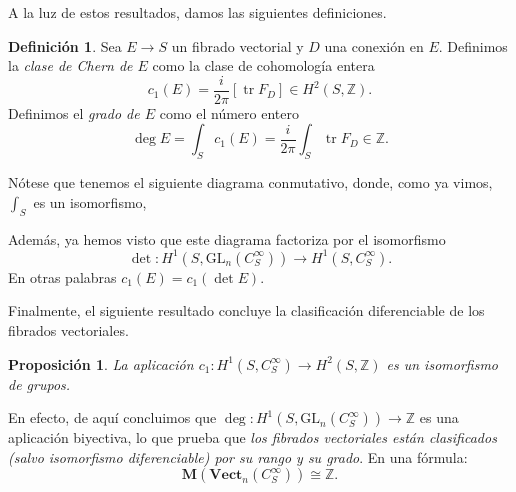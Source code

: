 \documentclass[12pt,a4paper]{article}
\newtheorem{prop}[thm]{Proposición}
\theoremstyle{definition} \newtheorem{defn}[thm]{Definición}
\theoremstyle{definition} \newtheorem{ejemplo}[thm]{Ejemplo}
\theoremstyle{definition} \newtheorem{ejercicio}[thm]{Ejercicio}
\def\GL{\mathrm{GL}}
\DeclareMathOperator{\tr}{tr}
\begin{document}
A la luz de estos resultados, damos las siguientes definiciones.

\begin{defn}
  Sea $E\rightarrow S$ un fibrado vectorial y $D$ una conexión en $E$. Definimos la \emph{clase de Chern de $E$} como la clase de cohomología entera
  \begin{equation*}
    c_1(E) = \frac{i}{2\pi} [\tr F_D] \in H^2(S,\mathbb{Z}).
  \end{equation*}
  Definimos el \emph{grado de $E$} como el número entero
  \begin{equation*}
    \deg E = \int_S c_1(E) = \frac{i}{2\pi} \int_S \tr F_D \in \mathbb{Z}.
  \end{equation*}
\end{defn}

Nótese que tenemos el siguiente diagrama conmutativo, donde, como ya vimos, $\int_S$ es un isomorfismo,
  \begin{center}
  \end{center}
Además, ya hemos visto que este diagrama factoriza por el isomorfismo $$\det:H^1(S,\GL_n(C^\infty_S)) \rightarrow H^1(S,C^\infty_S).$$ En otras palabras $c_1(E) = c_1(\det E)$.

Finalmente, el siguiente resultado concluye la clasificación diferenciable de los fibrados vectoriales.

\begin{prop}
  La aplicación $c_1:H^1(S,C^\infty_S) \rightarrow H^2(S,\mathbb{Z})$ es un isomorfismo de grupos.
\end{prop}

En efecto, de aquí concluimos que $\deg: H^1(S,\GL_n(C^\infty_S)) \rightarrow \mathbb{Z}$ es una aplicación biyectiva, lo que prueba que \emph{los fibrados vectoriales están clasificados (salvo isomorfismo diferenciable) por su rango y su grado}. En una fórmula:
\begin{equation*}
  \mathbf{M}(\mathbf{Vect}_n(C^\infty_S)) \cong \mathbb{Z}.
\end{equation*}
\end{document}
